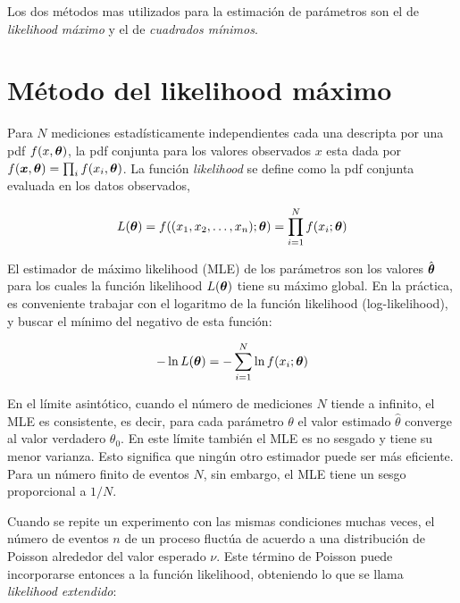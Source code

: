Los dos métodos mas utilizados para la estimación de parámetros son el de
\emph{likelihood máximo} y el de \emph{cuadrados mínimos}.


\section{Método del likelihood máximo}\label{sec:MLE}

Para $N$ mediciones estadísticamente independientes cada una descripta por una
pdf $f(x, \bm{\theta})$, la pdf conjunta para los valores observados $x$ esta dada
por $f(\bm{x}, \bm{\theta}) = \prod_i f(x_i, \bm{\theta})$. La función \emph{likelihood}
se define como la pdf conjunta evaluada en los datos observados,

\begin{equation}
  L(\bm{\theta}) = f((x_1, x_2, \ldots, x_n); \bm{\theta}) = \prod_{i=1}^{N} f(x_i;
  \bm{\theta})
\end{equation}

El estimador de máximo likelihood (MLE) de los parámetros {\btheta} son los
valores $\hat{\bm{\theta}}$ para los cuales la función likelihood $L(\bm{\theta})$ tiene
su máximo global. %
En la práctica, es conveniente trabajar con el logaritmo de la función
likelihood (log-likelihood), y buscar el mínimo del negativo de esta función:

\begin{equation}
  - \ln L(\bm{\theta}) = - \sum_{i=1}^{N} \ln f(x_i; \bm{\theta})
\end{equation}

En el límite asintótico, cuando el número de mediciones $N$ tiende a infinito,
el MLE es consistente, es decir, para cada parámetro $\theta$ el valor estimado
$\hat{\theta}$ converge al valor verdadero $\theta_0$. En este límite también el
MLE es no sesgado y tiene su menor varianza. Esto significa que ningún otro
estimador puede ser más eficiente. Para un número finito de eventos $N$, sin
embargo, el MLE tiene un sesgo proporcional a $1/N$.


Cuando se repite un experimento con las mismas condiciones muchas veces, el
número de eventos $n$ de un proceso fluctúa de acuerdo a una distribución
de Poisson alrededor del valor esperado $\nu$. Este término de Poisson puede
incorporarse entonces a la función likelihood, obteniendo lo que se llama
\emph{likelihood extendido}:

